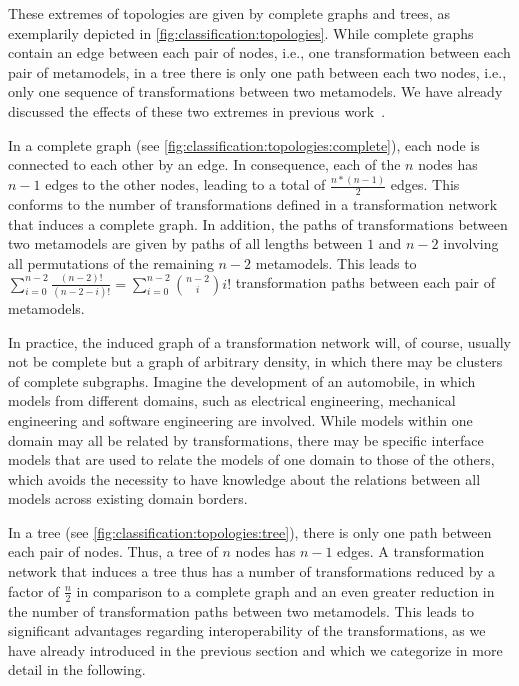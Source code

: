 These extremes of topologies are given by complete graphs and trees, as exemplarily depicted in \autoref{fig:classification:topologies}.
While complete graphs contain an edge between each pair of nodes, i.e., one transformation between each pair of metamodels, in a tree there is only one path between each two nodes, i.e., only one sequence of transformations between two metamodels.
We have already discussed the effects of these two extremes in previous work~.

In a complete graph (see \autoref{fig:classification:topologies:complete}), each node is connected to each other by an edge.
In consequence, each of the $n$ nodes has $n-1$ edges to the other nodes, leading to a total of $\frac{n*(n-1)}{2}$ edges.
This conforms to the number of transformations defined in a transformation network that induces a complete graph.
In addition, the paths of transformations between two metamodels are given by paths of all lengths between $1$ and $n-2$ involving all permutations of the remaining $n-2$ metamodels.
This leads to $\sum_{i=0}^{n-2} \frac{(n-2)!}{(n-2-i)!} = \sum_{i=0}^{n-2} \binom{n-2}{i} i!$ transformation paths between each pair of metamodels.

In practice, the induced graph of a transformation network will, of course, usually not be complete but a graph of arbitrary density, in which there may be clusters of complete subgraphs.
Imagine the development of an automobile, in which models from different domains, such as electrical engineering, mechanical engineering and software engineering are involved. 
While models within one domain may all be related by transformations, there may be specific interface models that are used to relate the models of one domain to those of the others, which avoids the necessity to have knowledge about the relations between all models across existing domain borders.

In a tree (see \autoref{fig:classification:topologies:tree}), there is only one path between each pair of nodes.
Thus, a tree of $n$ nodes has $n-1$ edges.
A transformation network that induces a tree thus has a number of transformations reduced by a factor of $\frac{n}{2}$ in comparison to a complete graph and an even greater reduction in the number of transformation paths between two metamodels.
This leads to significant advantages regarding interoperability of the transformations, as we have already introduced in the previous section and which we categorize in more detail in the following.


